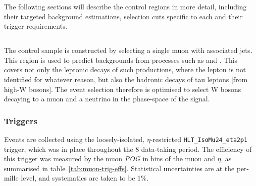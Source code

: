 The following sections will describe the control regions in more detail,
including their targeted background estimations, selection cuts specific to each
and their trigger requirements.

\subsection{\mj}

The \mj control sample is constructed by selecting a single muon with associated 
jets. This region is used to predict backgrounds from processes such as \wj and
\ttj. This covers not only the leptonic decays of such productions, where the 
lepton is not identified for whatever reason, but also the hadronic decays of tau 
leptons [from high-\Pt W bosons]. The event selection therefore is optimised to 
select W bosons decaying to a muon and a neutrino in the phase-space of the 
signal.

\subsubsection{Triggers}
\label{sec:mujets_control_trigger}
Events are collected using the loosely-isolated, $\eta$-restricted
\verb!HLT_IsoMu24_eta2p1! trigger, which was in place throughout the 8 \tev
data-taking period. The efficiency of this trigger was measured by the muon
\emph{POG} in bins of the muon \Pt and $\eta$, as summarised 
in table~\ref{tab:muon-trig-effs}. Statistical uncertainties are at the
per-mille level, and systematics are taken to be 1\%.

